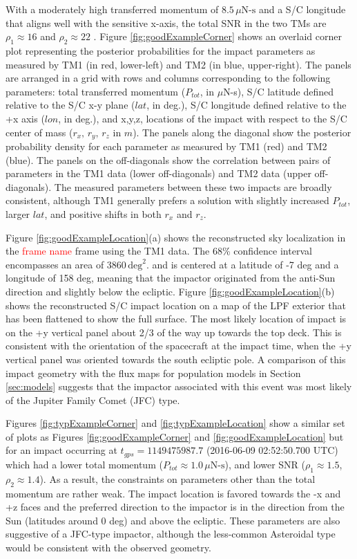 \documentclass[twocolumn, trackchanges]{aastex62}
\newcommand{\red}[1]{\textcolor{red}{#1}}
\begin{document}
\pagebreak

With a moderately high transferred momentum of $8.5\,\mu\textrm{N-s}$ and a S/C longitude that aligns well with the sensitive x-axis, the total SNR in the two TMs are $\rho_1\approx16$ and $\rho_2\approx22$ . Figure \ref{fig:goodExampleCorner} shows an overlaid corner plot representing the posterior probabilities for the impact parameters as measured by TM1 (in red, lower-left) and TM2 (in blue, upper-right).  The panels are arranged in a grid with rows and columns corresponding to the following parameters: total transferred momentum ($P_{tot}$, in $\mu$N-s), S/C latitude defined relative to the S/C x-y plane ($lat$, in deg.), S/C longitude defined relative to the +x axis ($lon$, in deg.), and x,y,z, locations of the impact with respect to the S/C center of mass ($r_x,\,r_y,\,r_z$ in $m$).  The panels along the diagonal show the posterior probability density for each parameter as measured by TM1 (red) and TM2 (blue).  The panels on the off-diagonals show the correlation between pairs of parameters in the TM1 data (lower off-diagonals) and TM2 data (upper off-diagonals). The measured parameters between these two impacts are broadly consistent, although TM1 generally prefers a solution with slightly increased $P_{tot}$, larger $lat$, and positive shifts in both $r_x$ and $r_z$. 

Figure \ref{fig:goodExampleLocation}(a) shows the reconstructed sky localization in the \red{frame name} frame using the TM1 data.  The 68\% confidence interval encompasses an area of 3860$\,\textrm{deg}^2$. and is centered at a latitude of -7 deg and a longitude of 158 deg, meaning that the impactor originated from the anti-Sun direction and slightly below the ecliptic. Figure \ref{fig:goodExampleLocation}(b) shows the reconstructed S/C impact location on a map of the LPF exterior that has been flattened to show the full surface.  The most likely location of impact is on the +y vertical panel about 2/3 of the way up towards the top deck. This is consistent with the orientation of the spacecraft at the impact time, when the +y vertical panel was oriented towards the south ecliptic pole. A comparison of this impact geometry with the flux maps for population models in Section \ref{sec:models} suggests that the impactor associated with this event was most likely of the Jupiter Family Comet (JFC) type. 

Figures \ref{fig:typExampleCorner} and \ref{fig:typExampleLocation} show a similar set of plots as Figures \ref{fig:goodExampleCorner} and \ref{fig:goodExampleLocation} but for an impact occurring at $t_{gps} = 1149475987.7$ (2016-06-09 02:52:50.700 UTC) which had a lower total momentum ($P_{tot}\approx1.0\,\mu\textrm{N-s}$), and lower SNR ($\rho_1\approx1.5$, $\rho_2\approx1.4$). As a result, the constraints on parameters other than the total momentum are rather weak.  The impact location is favored towards the -x and +z faces and the preferred direction to the impactor is in the direction from the Sun (latitudes around 0 deg) and above the ecliptic. These parameters are also suggestive of a JFC-type impactor, although the less-common Asteroidal type would be consistent with the observed geometry.
\end{document}
